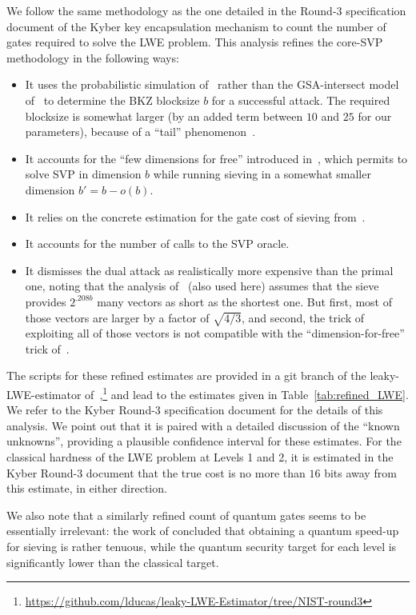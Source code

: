 We follow the same methodology as the one detailed in the Round-3 specification document of the Kyber key encapsulation mechanism \cite{EuroSP:Kyber} to count the number of gates required to solve the LWE problem. This analysis refines the core-SVP methodology in the following ways:
\begin{itemize}
	\item It uses the probabilistic simulation of~\cite{dachman2020lwe} rather than the GSA-intersect model of~\cite{USENIX:ADPS16,AC:AGVW17} to determine the BKZ blocksize $b$ for a successful attack. The required blocksize is somewhat larger (by an added term between $10$ and $25$ for our parameters), because of a ``tail'' phenomenon~\cite{yu2017second}.
	\item It accounts for the ``few dimensions for free'' introduced in~\cite{ducas2018shortest}, which permits to solve SVP in dimension $b$ while running sieving in a somewhat smaller dimension $b' = b-o(b)$.
	\item It relies on the concrete estimation for the gate cost of sieving from~\cite{albrecht2019estimating}.
	\item It accounts for the number of calls to the SVP oracle.
	\item It dismisses the dual attack as realistically more expensive than the primal one, noting that the analysis of~\cite{USENIX:ADPS16} (also used here) assumes that the sieve provides $2^{.208b}$ many vectors as short as the shortest one. But first, most of those vectors are larger by a factor of $\sqrt{4/3}$, and second, the trick of exploiting all of those vectors is not compatible with the ``dimension-for-free'' trick of~\cite{ducas2018shortest}.
\end{itemize}
The scripts for these refined estimates are provided in a git branch of the leaky-LWE-estimator of~\cite{dachman2020lwe},\footnote{\url{https://github.com/lducas/leaky-LWE-Estimator/tree/NIST-round3}} and lead to the estimates given in Table~\ref{tab:refined_LWE}. We refer to the Kyber Round-3 specification document for the details of this analysis. We point out that it is paired with a detailed discussion of the ``known unknowns'', providing a plausible confidence interval for these estimates. For the classical hardness of the LWE problem at Levels 1 and 2, it is estimated in the Kyber Round-3 document that the true cost is no more than $16$ bits away from this estimate, in either direction. 

We also note that a similarly refined count of quantum gates seems to be essentially irrelevant: the work of \cite{albrecht2019estimating} concluded that obtaining a quantum speed-up for sieving is rather tenuous, while the quantum security target for each level is significantly lower than the classical target. 


